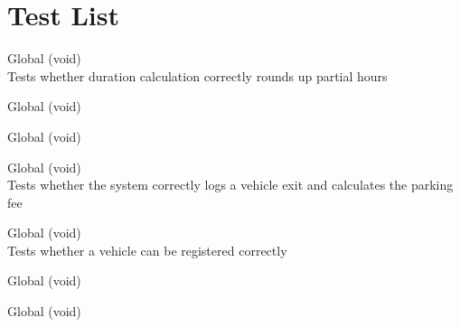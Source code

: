 \chapter{Test List }
\hypertarget{test}{}\label{test}

\begin{DoxyRefList}
\item[Global \doxylink{test__garage_8c_a85ae184b85791bc70870d69fbab8b4b7}{test\+\_\+calculate\+\_\+duration\+\_\+round\+\_\+up} (void)]\hfill \\
\label{test__test000003}%
%
Tests whether duration calculation correctly rounds up partial hours  
\item[Global \doxylink{test__garage_8c_a48da224c707eea66a07775ff04772308}{test\+\_\+double\+\_\+exit\+\_\+disallowed} (void)]\hfill \\
\label{test__test000007}%
%
  
\item[Global \doxylink{test__garage_8c_a5a1e6355eb40aa331f95b35b4721186a}{test\+\_\+garage\+\_\+capacity\+\_\+limit} (void)]\hfill \\
\label{test__test000006}%
%
  
\item[Global \doxylink{test__garage_8c_a6fca344d2cf880f1560f7b0808979021}{test\+\_\+log\+\_\+exit\+\_\+and\+\_\+fee} (void)]\hfill \\
\label{test__test000002}%
%
Tests whether the system correctly logs a vehicle exit and calculates the parking fee  
\item[Global \doxylink{test__garage_8c_a861b4d8b3c3da99b002da14fefac55be}{test\+\_\+register\+\_\+entry} (void)]\hfill \\
\label{test__test000001}%
%
Tests whether a vehicle can be registered correctly  
\item[Global \doxylink{test__garage_8c_a79b775c10e5e6dcfd95ec3e8101651a6}{test\+\_\+update\+\_\+entry\+\_\+time} (void)]\hfill \\
\label{test__test000004}%
%
  
\item[Global \doxylink{test__garage_8c_a764b926f793f87f3d154862aff84005c}{test\+\_\+update\+\_\+exit\+\_\+time} (void)]\hfill \\
\label{test__test000005}%
%
 
\end{DoxyRefList}